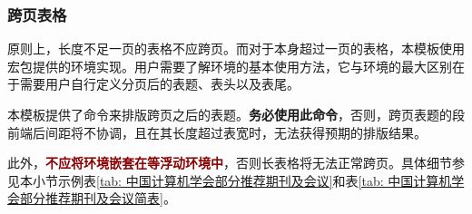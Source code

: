 \documentclass[QingNianC, vlined, timesmathnogreek]{nsfc}
\begin{document}
	
	\clearpage
	\subsubsection{跨页表格}
	
	原则上，长度不足一页的表格不应跨页。而对于本身超过一页的表格，本模板使用\href{https://mirrors.tuna.tsinghua.edu.cn/CTAN/macros/latex/required/tools/longtable.pdf}{\ttfamily\color{DarkRed}}宏包提供的环境实现。用户需要了解环境的基本使用方法，它与环境的最大区别在于需要用户自行定义分页后的表题、表头以及表尾。
	
	本模板提供了命令来排版跨页之后的表题。\textbf{务必使用此命令}，否则，跨页表题的段前端后间距将不协调，且在其长度超过表宽时，无法获得预期的排版结果。
	
	此外，\textbf{\textcolor{DarkRed}{不应将环境嵌套在等浮动环境中}}，否则长表格将无法正常跨页。具体细节参见本小节示例表\ref{tab: 中国计算机学会部分推荐期刊及会议}和表\ref{tab: 中国计算机学会部分推荐期刊及会议简表}。
	
\end{document}
